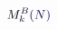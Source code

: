\documentclass[12pt]{article}
\begin{document}
\makeatletter
\renewcommand*{\@textcolor}[3]{%
  \protect\leavevmode
  \begingroup
    \color#1{#2}#3%
  \endgroup
}
\makeatother
\begin{displaymath}
\mathcolor[RGB]{0,0,15}{M} _ { \mathcolor[RGB]{0,0,30}{k} } ^ { \mathcolor[RGB]{0,0,45}{B} } \mathcolor[RGB]{0,0,60}{(} \mathcolor[RGB]{0,0,75}{N} \mathcolor[RGB]{0,0,90}{)}
\end{displaymath}
\end{document}
